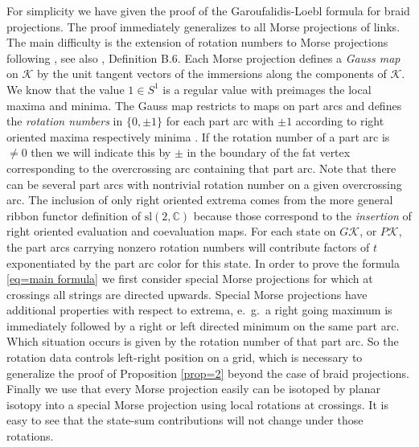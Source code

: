 \documentclass[11pt]{article}
\theoremstyle{definition}
\theoremstyle{remark}
\theoremstyle{remark}
\begin{document}
For simplicity we have given the proof of the Garoufalidis-Loebl formula \cite{GL} for braid projections. The proof immediately generalizes to all Morse projections of links. The main difficulty is the extension of rotation numbers to Morse projections following \cite{T}, see also \cite{GL}, Definition B.6. Each Morse projection defines a \textit{Gauss map} on $\mathcal{K}$ by the unit tangent vectors of the immersions along the components of $\mathcal{K}$. We know that the value $1\in S^1$ is a regular value with preimages the local maxima and minima. The Gauss map restricts to maps on part arcs and defines the \textit{rotation numbers} in $\{0,\pm 1\}$ for each part arc with $\pm 1$ according to right oriented maxima respectively minima \cite{W}. If the rotation number of a part arc is $\neq 0$ then we will indicate this by $\pm $ in the boundary of the fat vertex corresponding to the overcrossing arc containing that part arc. Note that there can be several part arcs with nontrivial rotation number on a given overcrossing arc. The inclusion of only right oriented extrema comes from 
the more general ribbon functor definition of $\textrm{sl}(2,\mathbb{C})$ because those correspond to the \textit{insertion} of right oriented evaluation and coevaluation maps. For each state on $G\mathcal{K}$, or $P\mathcal{K}$, the part arcs carrying nonzero rotation numbers will contribute factors of $t$ exponentiated by the part arc color for this state. In order to prove the formula \eqref{eq=main formula} we first consider special Morse projections for which at crossings all strings are directed upwards.
Special Morse projections have additional properties with respect to extrema, e.\ g.\ a right going maximum is immediately followed by a right or left directed minimum on the same part arc. Which situation occurs is given by the rotation number of that part arc. 
So the rotation data controls left-right position on a grid, which is necessary to generalize the proof of Proposition \ref{prop=2} beyond the case of braid projections. Finally we use that every Morse projection easily can be isotoped by planar isotopy into a special Morse projection using local rotations at crossings. It is easy to see that the state-sum contributions will not change under those rotations. 
\end{document}
